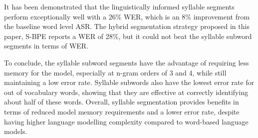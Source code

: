 It has been demonstrated that the linguistically informed syllable segments perform exceptionally well with a 26\% WER, which is an 8\% improvement from the baseline word level ASR. The hybrid segmentation strategy proposed in this paper, S-BPE reports a WER of 28\%, but it could not beat the syllable subword segments in terms of WER. 

To conclude, the syllable subword segments have the advantage of requiring less memory for the model, especially at n-gram orders of 3 and 4, while still maintaining a low error rate. Syllable subwords also have the lowest error rate for out of vocabulary words, showing that they are effective at correctly identifying about half of these words. Overall, syllable segmentation provides benefits in terms of reduced model memory requirements and a lower error rate, despite having higher language modelling complexity compared to word-based language models.
